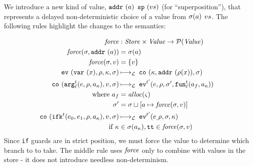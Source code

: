 \documentclass[9pt]{sigplanconf} %
\begin{document}
We introduce a new kind of value,
\spchoice
{${\tt addr}{\ }({a})$}
{${\tt sp}{\ }({v{s}})$ (for ``superposition'')},
%
that represents a delayed non-deterministic choice of a value from
\spchoice
{$\sigma(a)$}
{$v{s}$}.
%
The following rules highlight the changes to the semantics:

\renewcommand{\ext}{\mathit{ext}}
{\small
\begin{align*}
\spchoice
{\force &: \Store \times \Value \to \Set(\Value) \\
 \force(\msto,\saddr{\maddr}) &= \msto(\maddr) \\
 \force(\msto,\mval) &= \setof{\mval}}
{\force &: \Value \to \Set(\Value) \\
 \force(\superposition{\mval{s}}) &= \mval{s} \\
 \force(\mval) &= \{\mval\}}
\\
%
\ev{\svar{\mvar},\menv,\mkont,\msto} &\lmachstep\;
\spchoice
{\co{\mkont,\saddr{\menv(\mvar)},\msto}}
{\co{\mkont,\superposition{\msto(\menv(\mvar))},\msto}} \\
%
\co{\kar[^\mcntr_\mlab]{\mexp,\menv,\mkaddr},\mval,\msto}
&\lmachstep\;
\ev[^{\mcntr'}]{\mexp,\menv,\msto',\kfn[^\mcntr_\mlab]{\maddr_f,\mkaddr}} \\
\text{ where }
\maddr_f &= \alloc(\mstate) \\
\msto' &=
\spchoice
{\msto \sqcup[\maddr \mapsto \force(\msto,\mval)]}
{\msto \sqcup[\maddr \mapsto \force(\mval)]} \\
%
\co{\kif[^\mcntr]{\mexpi0,\mexpi1,\menv,\mkaddr},\mval,\msto}
&\lmachstep\;
\ev[^{\mcntr'}]{\mexpi,\menv,\msto,\mkont} \\
\text{ if } \mkont &\in \msto(\mkaddr),
            \strue \in \spchoice{\force(\msto,\mval)}{\force(\mval)}
\end{align*}}
Since {\tt if} guards are in strict position, we must force the value
to determine which branch to to take. The middle rule uses $\mathit{force}$
only to combine with values in the store - it does not introduce
needless non-determinism.
\end{document}
